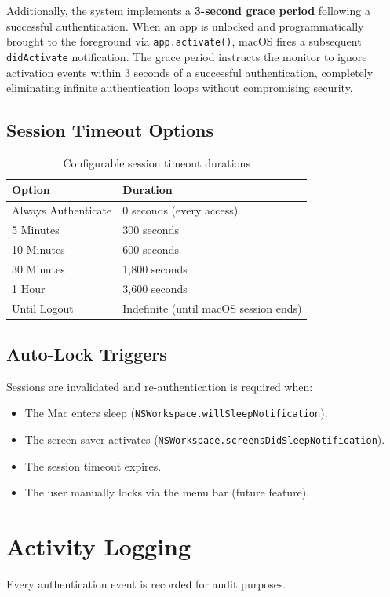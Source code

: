 \documentclass[12pt,a4paper]{report}
\begin{document}
Additionally, the system implements a \textbf{3-second grace period} following a successful authentication. When an app is unlocked and programmatically brought to the foreground via \texttt{app.activate()}, macOS fires a subsequent \texttt{didActivate} notification. The grace period instructs the monitor to ignore activation events within 3 seconds of a successful authentication, completely eliminating infinite authentication loops without compromising security.

\subsection{Session Timeout Options}
\begin{table}[H]
\centering
\begin{tabular}{ll}
\toprule
\textbf{Option} & \textbf{Duration} \\
\midrule
Always Authenticate & 0 seconds (every access) \\
5 Minutes & 300 seconds \\
10 Minutes & 600 seconds \\
30 Minutes & 1,800 seconds \\
1 Hour & 3,600 seconds \\
Until Logout & Indefinite (until macOS session ends) \\
\bottomrule
\end{tabular}
\caption{Configurable session timeout durations}
\end{table}

\subsection{Auto-Lock Triggers}
Sessions are invalidated and re-authentication is required when:
\begin{itemize}[noitemsep]
    \item The Mac enters sleep (\texttt{NSWorkspace.willSleepNotification}).
    \item The screen saver activates (\texttt{NSWorkspace.screensDidSleepNotification}).
    \item The session timeout expires.
    \item The user manually locks via the menu bar (future feature).
\end{itemize}

\section{Activity Logging}
Every authentication event is recorded for audit purposes.
\end{document}
